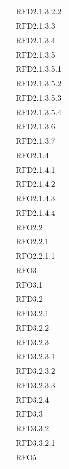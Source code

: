 \begin{longtable}{|>{\centering}m{10cm}|m{3cm}<{\centering}|}
& RFD2.1.3.2.2\\
& RFD2.1.3.3\\
& RFD2.1.3.4\\
& RFD2.1.3.5\\
& RFD2.1.3.5.1\\
& RFD2.1.3.5.2\\
& RFD2.1.3.5.3\\
& RFD2.1.3.5.4\\
& RFD2.1.3.6\\
& RFD2.1.3.7\\
& RFO2.1.4\\
& RFD2.1.4.1\\
& RFD2.1.4.2\\
& RFO2.1.4.3\\
& RFD2.1.4.4\\
& RFO2.2\\
& RFO2.2.1\\
& RFO2.2.1.1\\
& RFO3\\
& RFO3.1\\
& RFD3.2\\
& RFD3.2.1\\
& RFD3.2.2\\
& RFD3.2.3\\
& RFD3.2.3.1\\
& RFD3.2.3.2\\
& RFD3.2.3.3\\
& RFD3.2.4\\
& RFD3.3\\
& RFD3.3.2\\
& RFD3.3.2.1\\
& RFO5\\ \hline


\end{longtable}
